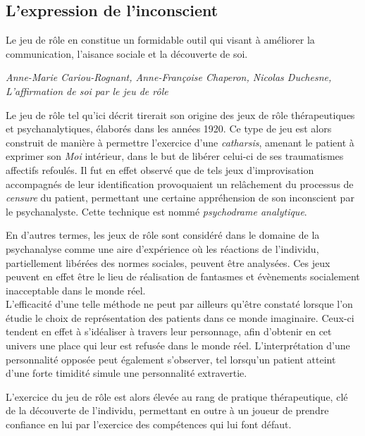\clearpage


\subsection{L'expression de l'inconscient}

\begin{shadequote}
Le jeu de rôle en constitue un formidable outil qui visant à améliorer la communication, l'aisance sociale et la découverte de soi.
\par\emph{Anne-Marie Cariou-Rognant, Anne-Françoise Chaperon, Nicolas Duchesne, L'affirmation de soi par le jeu de rôle}
\end{shadequote}

Le jeu de rôle tel qu'ici décrit tirerait son origine des jeux de rôle thérapeutiques et psychanalytiques, élaborés dans les années 1920. Ce type de jeu est alors construit de manière à permettre l'exercice d'une \textit{catharsis}, amenant le patient à exprimer son \textit{Moi} intérieur, dans le but de libérer celui-ci de ses traumatismes affectifs refoulés. Il fut en effet observé que de tels jeux d'improvisation accompagnés de leur identification provoquaient un relâchement du processus de \textit{censure} du patient, permettant une certaine appréhension de son inconscient par le psychanalyste. Cette technique est nommé \textit{psychodrame analytique}.

En d'autres termes, les jeux de rôle sont considéré dans le domaine de la psychanalyse comme une aire d'expérience où les réactions de l'individu, partiellement libérées des normes sociales, peuvent être analysées. Ces jeux peuvent en effet être le lieu de réalisation de fantasmes et évènements socialement inacceptable dans le monde réel.\\


L'efficacité d'une telle méthode ne peut par ailleurs qu'être constaté lorsque l'on étudie le choix de représentation des patients dans ce monde imaginaire. Ceux-ci tendent en effet à s'idéaliser à travers leur personnage, afin d'obtenir en cet univers une place qui leur est refusée dans le monde réel. L'interprétation d'une personnalité opposée peut également s'observer, tel lorsqu'un patient atteint d'une forte timidité simule une personnalité extravertie.

L'exercice du jeu de rôle est alors élevée au rang de pratique thérapeutique, clé de la découverte de l'individu, permettant en outre à un joueur de prendre confiance en lui par l'exercice des compétences qui lui font défaut.



